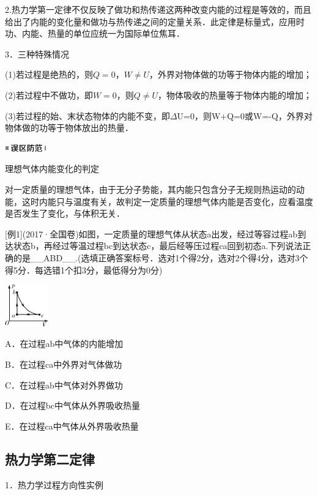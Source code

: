 2.热力学第一定律不仅反映了做功和热传递这两种改变内能的过程是等效的，而且给出了内能的变化量和做功与热传递之间的定量关系．此定律是标量式，应用时功、内能、热量的单位应统一为国际单位焦耳．

3．三种特殊情况

(1)若过程是绝热的，则$Q=0，W\neq U$，外界对物体做的功等于物体内能的增加；

(2)若过程中不做功，即$W=0，则Q\neq U$，物体吸收的热量等于物体内能的增加；

(3)若过程的始、末状态物体的内能不变，即$\Delta$U=0，则W+Q=0或W=-Q，外界对物体做的功等于物体放出的热量．

\begin{center}\includegraphics[width=0.70764in,height=0.12292in]{media/image34.png}\end{center}
理想气体内能变化的判定

对一定质量的理想气体，由于无分子势能，其内能只包含分子无规则热运动的动能，这时内能只与温度有关，故判定一定质量的理想气体内能是否变化，应看温度是否发生了变化，与体积无关．

{[}例1{]}(2017·全国卷\uppercase\expandafter{})如图，一定质量的理想气体从状态a出发，经过等容过程ab到达状态b，再经过等温过程bc到达状态c，最后经等压过程ca回到初态a.下列说法正确的是\_\_ABD\_\_.(选填正确答案标号．选对1个得2分，选对2个得4分，选对3个得5分．每选错1个扣3分，最低得分为0分)

\begin{center}\includegraphics[width=0.74514in,height=0.71667in]{media/image506.png}\end{center}
A．在过程ab中气体的内能增加

B．在过程ca中外界对气体做功

C．在过程ab中气体对外界做功

D．在过程bc中气体从外界吸收热量

E．在过程ca中气体从外界吸收热量

\subsection{热力学第二定律}

1．热力学过程方向性实例

